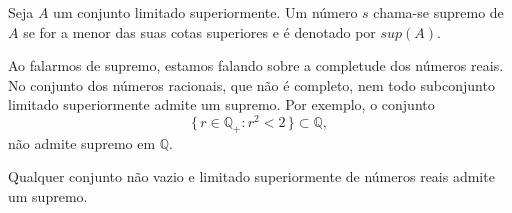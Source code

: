 \documentclass[../main.tex]{subfiles}
\begin{document}
\begin{defi}
    Seja $A$ um conjunto limitado superiormente. Um número $s$ chama-se supremo de $A$ se for a menor das suas cotas superiores e é denotado por $sup(A)$.
\end{defi}
\begin{ex}
Ao falarmos de supremo, estamos falando sobre a completude dos números reais. No conjunto dos números racionais, que não é completo, nem todo subconjunto limitado superiormente admite um supremo. Por exemplo, o conjunto 
\[ \{\, r \in \mathbb{Q}_+ : r^2 < 2 \,\} \subset \mathbb{Q}, \] 
não admite supremo em $\mathbb{Q}$.
\end{ex}
\begin{teo}\label{enum-teo-supremo}
    Qualquer conjunto não vazio e limitado superiormente de números reais admite um supremo. 
\end{teo}
\end{document}
